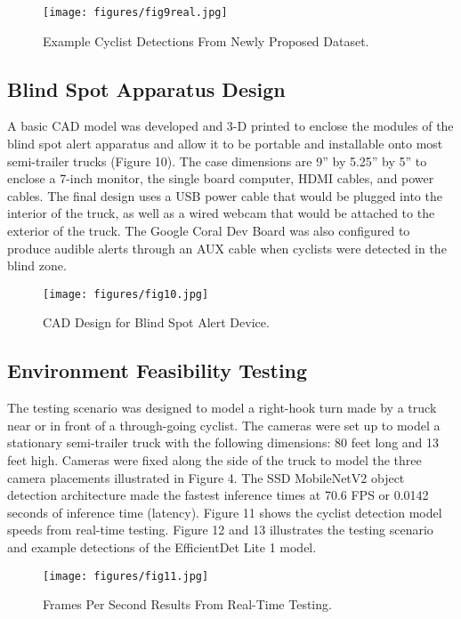\documentclass{article}
\begin{document}
\begin{figure}[b]
\centering
\texttt{[image: figures/fig9real.jpg]}
\caption{Example Cyclist Detections From Newly Proposed Dataset.}
\label{fig:fig9}
\end{figure}

\subsection{Blind Spot Apparatus Design}
A basic CAD model was developed and 3-D printed to enclose the modules of the blind spot alert apparatus and allow it to be portable and installable onto most semi-trailer trucks (Figure 10). The case dimensions are 9” by 5.25” by 5” to enclose a 7-inch monitor, the single board computer, HDMI cables, and power cables. The final design uses a USB power cable that would be plugged into the interior of the truck, as well as a wired webcam that would be attached to the exterior of the truck. The Google Coral Dev Board was also configured to produce audible alerts through an AUX cable when cyclists were detected in the blind zone. 

\begin{figure}
\centering
\texttt{[image: figures/fig10.jpg]}
\caption{CAD Design for Blind Spot Alert Device.}
\label{fig:fig10}
\end{figure}

\subsection{Environment Feasibility Testing}
The testing scenario was designed to model a right-hook turn made by a truck near or in front of a through-going cyclist. The cameras were set up to model a stationary semi-trailer truck with the following dimensions: 80 feet long and 13 feet high. Cameras were fixed along the side of the truck to model the three camera placements illustrated in Figure 4. The SSD MobileNetV2 object detection architecture made the fastest inference times at 70.6 FPS or 0.0142 seconds of inference time (latency). Figure 11 shows the cyclist detection model speeds from real-time testing. Figure 12 and 13 illustrates the testing scenario and example detections of the EfficientDet Lite 1 model.

\begin{figure}
\centering
\texttt{[image: figures/fig11.jpg]}
\caption{Frames Per Second Results From Real-Time Testing.}
\label{fig:fig11}
\end{figure}
\end{document}
